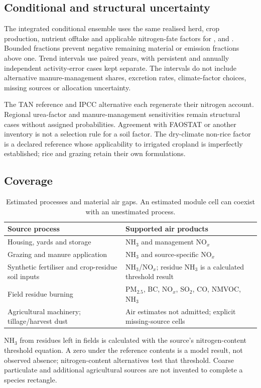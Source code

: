 \subsection{Conditional and structural uncertainty}\label{sec:ap-structural}\label{tab:apstruct}
The integrated conditional ensemble uses the same realised herd, crop production, nutrient offtake and applicable nitrogen-fate factors for \NHthree{}, \NOx{} and \NtwoO{}. Bounded fractions prevent negative remaining material or emission fractions above one. Trend intervals use paired years, with persistent and annually independent activity-error cases kept separate. The intervals do not include alternative manure-management shares, excretion rates, climate-factor choices, missing sources or allocation uncertainty.

The TAN reference and IPCC alternative each regenerate their nitrogen account. Regional urea-factor and manure-management sensitivities remain structural cases without assigned probabilities. Agreement with FAOSTAT or another inventory is not a selection rule for a soil factor. The dry-climate non-rice factor is a declared reference whose applicability to irrigated cropland is imperfectly established; rice and grazing retain their own formulations.

\subsection{Coverage}\label{sec:ap-completeness}\label{sec:ap-scope}
\begin{table}[htbp]\centering\small
\begin{tabular}{@{}p{.43\linewidth}p{.48\linewidth}@{}}\toprule
Source process & Supported air products\\\midrule
Housing, yards and storage & NH$_3$ and management NO$_x$\\
Grazing and manure application & NH$_3$ and source-specific NO$_x$\\
Synthetic fertiliser and crop-residue soil inputs & NH$_3$/NO$_x$; residue NH$_3$ is a calculated threshold result\\
Field residue burning & PM$_{2.5}$, BC, NO$_x$, SO$_2$, CO, NMVOC, NH$_3$\\
Agricultural machinery; tillage/harvest dust & Air estimates not admitted; explicit missing-source cells\\\bottomrule
\end{tabular}
\caption{Estimated processes and material air gaps. An estimated module cell can coexist with an unestimated process.}\label{tab:apcompleteness}
\end{table}
NH$_3$ from residues left in fields is calculated with the source's nitrogen-content threshold equation. A zero under the reference contents is a model result, not observed absence; nitrogen-content alternatives test that threshold. Coarse particulate and additional agricultural sources are not invented to complete a species rectangle.

